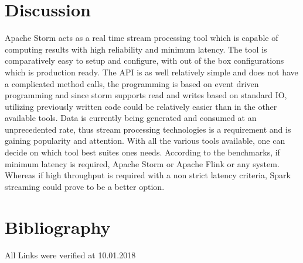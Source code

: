\documentclass[runningheads,a4paper]{llncs}[2015/06/24]
\begin{document}
 \section{Discussion}
Apache Storm acts as a real time stream processing tool which is capable of computing results with high reliability and minimum latency. The tool is comparatively easy to setup and configure, with out of the box configurations which is production ready. The API is as well relatively simple and does not have a complicated method calls, the programming is based on event driven programming and since storm supports read and writes based on standard IO, utilizing previously written code could be relatively easier than in the other available tools. Data is currently being generated and consumed at an unprecedented rate, thus stream processing technologies is a requirement and is gaining popularity and attention. With all the various tools available, one can decide on which tool best suites ones needs. According to the benchmarks, if minimum latency is required, Apache Storm or Apache Flink or any system. Whereas if high throughput is required with a non strict latency criteria, Spark streaming could prove to be a better option.



\section{Bibliography}


All Links were verified at 10.01.2018
\end{document}
